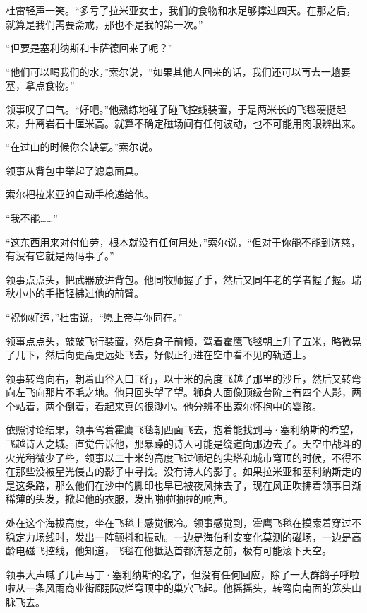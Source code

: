 \documentclass[AutoFakeBold=true]{book}
\begin{document}
杜雷轻声一笑。``多亏了拉米亚女士，我们的食物和水足够撑过四天。在那之后，就算是我们需要斋戒，那也不是我的第一次。''

``但要是塞利纳斯和卡萨德回来了呢？''

``他们可以喝我们的水，''索尔说，``如果其他人回来的话，我们还可以再去一趟要塞，拿点食物。''

领事叹了口气。``好吧。''他熟练地碰了碰飞控线装置，于是两米长的飞毯硬挺起来，升离岩石十厘米高。就算不确定磁场间有任何波动，也不可能用肉眼辨出来。

``在过山的时候你会缺氧。''索尔说。

领事从背包中举起了滤息面具。

索尔把拉米亚的自动手枪递给他。

``我不能……''

``这东西用来对付伯劳，根本就没有任何用处，''索尔说，``但对于你能不能到济慈，有没有它就是两码事了。''

领事点点头，把武器放进背包。他同牧师握了手，然后又同年老的学者握了握。瑞秋小小的手指轻拂过他的前臂。

``祝你好运，''杜雷说，``愿上帝与你同在。''

领事点点头，敲敲飞行装置，然后身子前倾，驾着霍鹰飞毯朝上升了五米，略微晃了几下，然后向更高更远处飞去，好似正行进在空中看不见的轨道上。

领事转弯向右，朝着山谷入口飞行，以十米的高度飞越了那里的沙丘，然后又转弯向左飞向那片不毛之地。他只回头望了望。狮身人面像顶级台阶上有四个人影，两个站着，两个倒着，看起来真的很渺小。他分辨不出索尔怀抱中的婴孩。

\vspace*{1em}

依照讨论结果，领事驾着霍鹰飞毯朝西面飞去，抱着能找到马·塞利纳斯的希望，飞越诗人之城。直觉告诉他，那暴躁的诗人可能是绕道向那边去了。天空中战斗的火光稍微少了些，领事以二十米的高度飞过倾圮的尖塔和城市穹顶的时候，不得不在那些没被星光侵占的影子中寻找。没有诗人的影子。如果拉米亚和塞利纳斯走的是这条路，那么他们在沙中的脚印也早已被夜风抹去了，现在风正吹拂着领事日渐稀薄的头发，掀起他的衣服，发出啪啦啪啦的响声。

处在这个海拔高度，坐在飞毯上感觉很冷。领事感觉到，霍鹰飞毯在摸索着穿过不稳定力场线时，发出一阵颤抖和振动。一边是海伯利安变化莫测的磁场，一边是高龄电磁飞控线，他知道，飞毯在他抵达首都济慈之前，极有可能滚下天空。

领事大声喊了几声马丁·塞利纳斯的名字，但没有任何回应，除了一大群鸽子呼啦啦从一条风雨商业街廊那破烂穹顶中的巢穴飞起。他摇摇头，转弯向南面的笼头山脉飞去。
\end{document}
